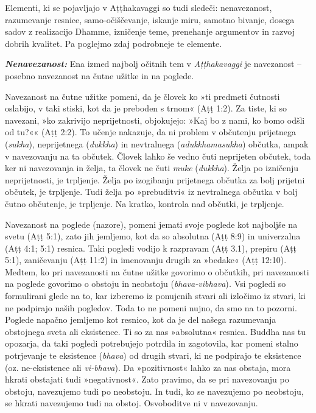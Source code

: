Elementi, ki se pojavljajo v Aṭṭhakavaggi so tudi sledeči:
nenavezanost, razumevanje resnice, samo-očiščevanje, iskanje miru,
samotno bivanje, dosega sadov z realizacijo Dhamme, izničenje teme,
prenehanje argumentov in razvoj dobrih kvalitet. Pa poglejmo zdaj
podrobneje te elemente.

\textbf{\emph{Nenavezanost:}} Ena izmed najbolj očitnih tem v
\emph{Aṭṭhakavaggi} je navezanost -- posebno navezanost na čutne užitke
in na poglede.

Navezanost na čutne užitke pomeni, da je človek ko »ti predmeti
čutnosti oslabijo, v taki stiski, kot da je preboden s trnom« (Aṭṭ 1:2).
Za tiste, ki so navezani, »ko zakrivijo neprijetnosti, objokujejo: »Kaj
bo z nami, ko bomo odšli od tu?«« (Aṭṭ 2:2). To učenje nakazuje, da ni
problem v občutenju prijetnega (\emph{sukha}), neprijetnega
(\emph{dukkha}) in nevtralnega (\emph{adukkhamasukha}) občutka, ampak v
navezovanju na ta občutek. Človek lahko še vedno čuti neprijeten
občutek, toda ker ni navezovanja in želja, ta človek ne čuti \emph{muke}
(\emph{dukkha}). Želja po izničenju neprijetnosti, je trpljenje. Želja
po izogibanju prijetnega občutka za bolj prijetni občutek, je trpljenje.
Tudi želja po »prebuditvi« iz nevtralnega občutka v bolj čutno
občutenje, je trpljenje. Na kratko, kontrola nad občutki, je trpljenje.

Navezanost na poglede (nazore), pomeni jemati svoje poglede kot
najboljše na svetu (Aṭṭ 5:1), zato jih jemljemo, kot da so absolutna
(Aṭṭ 8:9) in univerzalna (Aṭṭ 4:1; 5:1) resnica. Taki pogledi vodijo k
razpravam (Aṭṭ 3.1), prepiru (Aṭṭ 5:1), zaničevanju (Aṭṭ 11:2) in
imenovanju drugih za »bedake« (Aṭṭ 12:10). Medtem, ko pri navezanosti na
čutne užitke govorimo o občutkih, pri navezanosti na poglede govorimo o
obstoju in neobstoju (\emph{bhava-vibhava})\emph{.} Vsi pogledi so
formulirani glede na to, kar izberemo iz ponujenih stvari ali izločimo
iz stvari, ki ne podpirajo naših pogledov. Toda to ne pomeni nujno, da
smo na to pozorni. Poglede napačno jemljemo kot resnico, kot da je del
našega razumevanja obstojnega sveta ali eksistence. Ti so za nas
»absolutna« resnica. Buddha nas tu opozarja, da taki pogledi potrebujejo
potrdila in zagotovila, kar pomeni stalno potrjevanje te eksistence
(\emph{bhava}) od drugih stvari, ki ne podpirajo te eksistence (oz.
ne-eksistence ali \emph{vi-bhava}). Da »pozitivnost« lahko za nas
obstaja, mora hkrati obstajati tudi »negativnost«. Zato pravimo, da se
pri navezovanju po obstoju, navezujemo tudi po neobstoju. In tudi, ko se
navezujemo po neobstoju, se hkrati navezujemo tudi na obstoj.
Osvoboditve ni v navezovanju.

